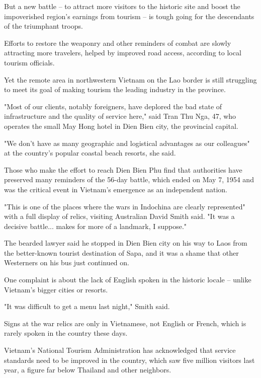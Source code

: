 \documentclass{article}
\begin{document}
\begin{multicols}{3} 
But a new battle -- to attract more visitors to the historic site and boost the impoverished region's earnings from tourism -- is tough going for the descendants of the triumphant troops.

Efforts to restore the weaponry and other reminders of combat are slowly attracting more travelers, helped by improved road access, according to local tourism officials.

Yet the remote area in northwestern Vietnam on the Lao border is still struggling to meet its goal of making tourism the leading industry in the province.

"Most of our clients, notably foreigners, have deplored the bad state of infrastructure and the quality of service here," said Tran Thu Nga, 47, who operates the small May Hong hotel in Dien Bien city, the provincial capital.

"We don't have as many geographic and logistical advantages as our colleagues" at the country's popular coastal beach resorts, she said.

Those who make the effort to reach Dien Bien Phu find that authorities have preserved many reminders of the 56-day battle, which ended on May 7, 1954 and was the critical event in Vietnam's emergence as an independent nation.

"This is one of the places where the wars in Indochina are clearly represented" with a full display of relics, visiting Australian David Smith said. "It was a decisive battle... makes for more of a landmark, I suppose."

The bearded lawyer said he stopped in Dien Bien city on his way to Laos from the better-known tourist destination of Sapa, and it was a shame that other Westerners on his bus just continued on.

One complaint is about the lack of English spoken in the historic locale -- unlike Vietnam's bigger cities or resorts.

"It was difficult to get a menu last night," Smith said.

Signs at the war relics are only in Vietnamese, not English or French, which is rarely spoken in the country these days.

Vietnam's National Tourism Administration has acknowledged that service standards need to be improved in the country, which saw five million visitors last year, a figure far below Thailand and other neighbors.


\end{multicols}
\end{document}
